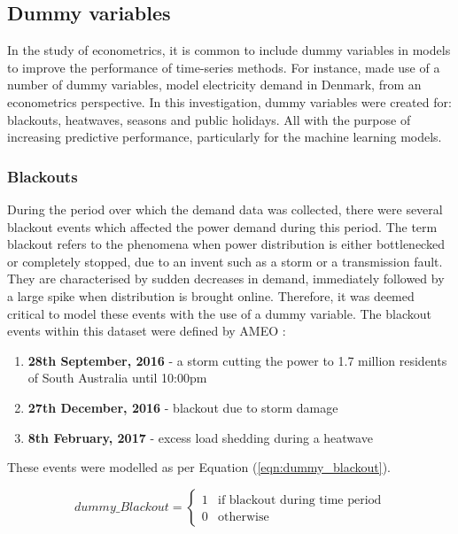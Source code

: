 \documentclass[11pt]{article}
\begin{document}

\subsection{Dummy variables}
\label{section:dummy_variables}
In the study of econometrics, it is common to include dummy variables in models to improve the performance of time-series methods. For instance, \citet{moller_econometric_2015} made use of a number of dummy variables, model electricity demand in Denmark, from an econometrics perspective. In this investigation, dummy variables were created for: blackouts, heatwaves, seasons and public holidays. All with the purpose of increasing predictive performance, particularly for the machine learning models. 

\subsubsection{Blackouts}
\label{section:blackouts}

During the period over which the demand data was collected, there were several blackout events which affected the power demand during this period. The term blackout refers to the phenomena when power distribution is either bottlenecked or completely stopped, due to an invent such as a storm or a transmission fault. They are characterised by sudden decreases in demand, immediately followed by a large spike when distribution is brought online. Therefore, it was deemed critical to model these events with the use of a dummy variable. The blackout events within this dataset were defined by AMEO \citep{noauthor_sa_2016}:

\begin{enumerate}
\item \textbf{28th September, 2016} - a storm cutting the power to 1.7 million residents of South Australia until 10:00pm 
\item \textbf{27th December, 2016} - blackout due to storm damage
\item \textbf{8th February, 2017} - excess load shedding during a heatwave
\end{enumerate}

\noindent These events were modelled as per Equation (\ref{eqn:dummy_blackout}).

\begin{equation}
\label{eqn:dummy_blackout}
dummy\_Blackout = 
  \begin{cases}
	1 & \text{if blackout during time period} \\
    0 & \text{otherwise}
  \end{cases}
\end{equation}
\end{document}
